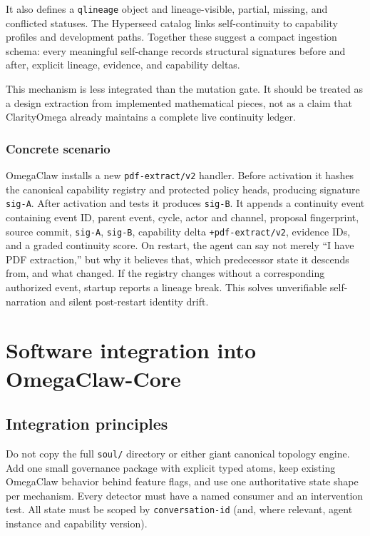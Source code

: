 \documentclass[11pt]{article}
\begin{document}
It also defines a \texttt{qlineage} object and lineage-visible, partial, missing,
and conflicted statuses.  The Hyperseed catalog links self-continuity to capability
profiles and development paths.  Together these suggest a compact ingestion
schema: every meaningful self-change records structural signatures before and
after, explicit lineage, evidence, and capability deltas.

This mechanism is less integrated than the mutation gate.  It should be treated
as a design extraction from implemented mathematical pieces, not as a claim that
ClarityOmega already maintains a complete live continuity ledger.

\subsubsection{Concrete scenario}

OmegaClaw installs a new \texttt{pdf-extract/v2} handler.  Before activation it
hashes the canonical capability registry and protected policy heads, producing
signature \texttt{sig-A}.  After activation and tests it produces
\texttt{sig-B}.  It appends a continuity event containing event ID, parent event,
cycle, actor and channel, proposal fingerprint, source commit, \texttt{sig-A},
\texttt{sig-B}, capability delta \texttt{+pdf-extract/v2}, evidence IDs, and a
graded continuity score.  On restart, the agent can say not merely ``I have PDF
extraction,'' but why it believes that, which predecessor state it descends from,
and what changed.  If the registry changes without a corresponding authorized
event, startup reports a lineage break.  This solves unverifiable self-narration
and silent post-restart identity drift.

\section{Software integration into OmegaClaw-Core}

\subsection{Integration principles}

Do not copy the full \texttt{soul/} directory or either giant canonical topology
engine.  Add one small governance package with explicit typed atoms, keep existing
OmegaClaw behavior behind feature flags, and use one authoritative state shape
per mechanism.  Every detector must have a named consumer and an intervention
test.  All state must be scoped by \texttt{conversation-id} (and, where relevant,
agent instance and capability version).
\end{document}
